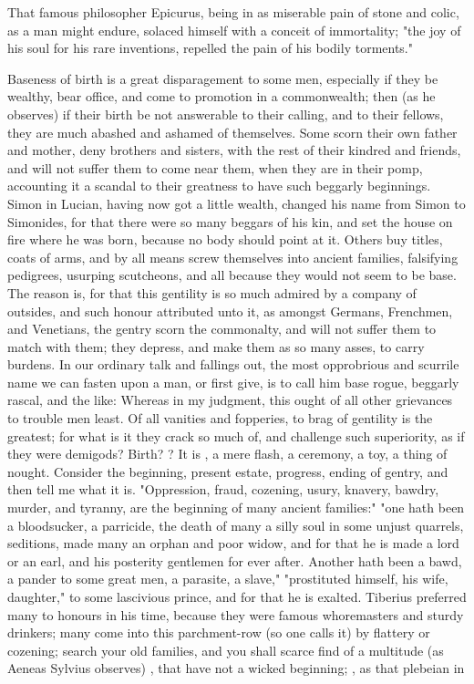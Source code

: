 {That famous philosopher Epicurus, being in as miserable pain of stone and colic, as a man might endure, solaced himself with a conceit of immortality; "the joy of his soul for his rare inventions, repelled the pain of his bodily torments."

Baseness of birth is a great disparagement to some men, especially if they be wealthy, bear office, and come to promotion in a commonwealth; then (as he observes) if their birth be not answerable to their calling, and to their fellows, they are much abashed and ashamed of themselves. Some scorn their own father and mother, deny brothers and sisters, with the rest of their kindred and friends, and will not suffer them to come near them, when they are in their pomp, accounting it a scandal to their greatness to have such beggarly beginnings. Simon in Lucian, having now got a little wealth, changed his name from Simon to Simonides, for that there were so many beggars of his kin, and set the house on fire where he was born, because no body should point at it. Others buy titles, coats of arms, and by all means screw themselves into ancient families, falsifying pedigrees, usurping scutcheons, and all because they would not seem to be base. The reason is, for that this gentility is so much admired by a company of outsides, and such honour attributed unto it, as amongst Germans, Frenchmen, and Venetians, the gentry scorn the commonalty, and will not suffer them to match with them; they depress, and make them as so many asses, to carry burdens. In our ordinary talk and fallings out, the most opprobrious and scurrile name we can fasten upon a man, or first give, is to call him base rogue, beggarly rascal, and the like: Whereas in my judgment, this ought of all other grievances to trouble men least. Of all vanities and fopperies, to brag of gentility is the greatest; for what is it they crack so much of, and challenge such superiority, as if they were demigods? Birth? ? It is , a mere flash, a ceremony, a toy, a thing of nought. Consider the beginning, present estate, progress, ending of gentry, and then tell me what it is. "Oppression, fraud, cozening, usury, knavery, bawdry, murder, and tyranny, are the beginning of many ancient families:" "one hath been a bloodsucker, a parricide, the death of many a silly soul in some unjust quarrels, seditions, made many an orphan and poor widow, and for that he is made a lord or an earl, and his posterity gentlemen for ever after. Another hath been a bawd, a pander to some great men, a parasite, a slave," "prostituted himself, his wife, daughter," to some lascivious prince, and for that he is exalted. Tiberius preferred many to honours in his time, because they were famous whoremasters and sturdy drinkers; many come into this parchment-row (so one calls it) by flattery or cozening; search your old families, and you shall scarce find of a multitude (as Aeneas Sylvius observes) , that have not a wicked beginning; , as that plebeian in }
